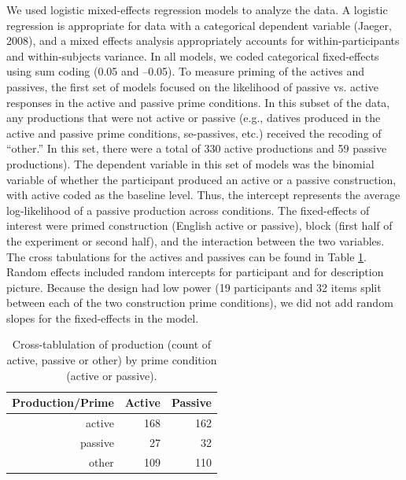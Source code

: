 We used logistic mixed-effects regression models to analyze the data. A logistic regression is appropriate for data with a categorical dependent variable (Jaeger, 2008), and a mixed effects analysis appropriately accounts for within-participants and within-subjects variance. In all models, we coded categorical fixed-effects using sum coding (0.05 and --0.05). To measure priming of the actives and passives, the first set of models focused on the likelihood of passive vs. active responses in the active and passive prime conditions. In this subset of the data, any productions that were not active or passive (e.g., datives produced in the active and passive prime conditions, se-passives, etc.) received the recoding of ``other.'' In this set, there were a total of 330 active productions and 59 passive productions). The dependent variable in this set of models was the binomial variable of whether the participant produced an active or a passive construction, with active coded as the baseline level. Thus, the intercept represents the average log-likelihood of a passive production across conditions. The fixed-effects of interest were primed construction (English active or passive), block (first half of the experiment or second half), and the interaction between the two variables. The cross tabulations for the actives and passives can be found in Table \ref{tab:priming.crosstabs.ap}. Random effects included random intercepts for participant and for description picture. Because the design had low power (19 participants and 32 items split between each of the two construction prime conditions), we did not add random slopes for the fixed-effects in the model. 

\begin{table}[htbp]
  \centering
  \caption{Cross-tablulation of production (count of active, passive or other) by prime condition (active or passive).}
    \begin{tabular}{rrr}
    \toprule
    Production/Prime & Active & Passive \\
    \midrule
    active & 168   & 162 \\
    passive & 27    & 32 \\
    other & 109   & 110 \\
    \bottomrule
    \end{tabular}%
  \label{tab:priming.crosstabs.ap}%
\end{table}%


